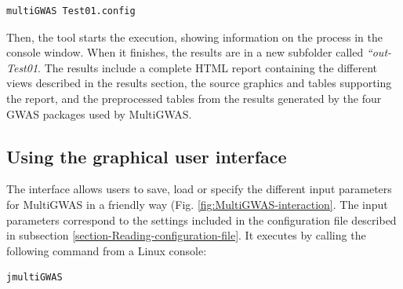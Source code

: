 \documentclass{article}
\begin{document}
\begin{lstlisting}[language=bash,basicstyle={\small}]
multiGWAS Test01.config
\end{lstlisting}

Then, the tool starts the execution, showing information on the process in the console window. When it finishes, the results are in a new subfolder called \emph{``out-Test01}.  The results include a complete HTML report containing the different views described in the results section, the source graphics and tables supporting the report, and the preprocessed tables from the results generated by the four GWAS packages used by MultiGWAS.


\subsection{Using the graphical user interface}
The interface allows users to save, load or specify the different input parameters for MultiGWAS in a friendly way (Fig. \ref{fig:MultiGWAS-interaction}. The input parameters correspond to the settings included in the configuration file described in subsection \ref{section-Reading-configuration-file}. It executes by calling the following command from a Linux console:

\begin{lstlisting}[language=bash,basicstyle={\small}]
jmultiGWAS
\end{lstlisting}
\end{document}
